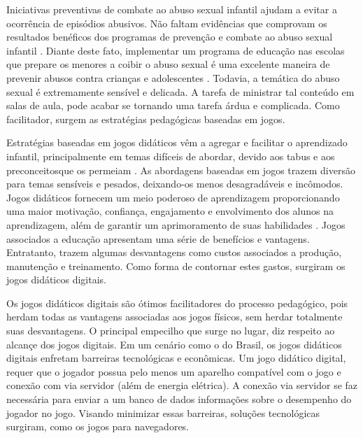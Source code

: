 Iniciativas preventivas de combate ao abuso sexual infantil ajudam a evitar a ocorrência de episódios abusivos. Não faltam evidências que comprovam os resultados benéficos dos programas de prevenção e combate ao abuso sexual infantil \cite{maria2010papel}. Diante deste fato, implementar um programa de educação nas escolas que prepare os menores a coibir o abuso sexual é uma excelente maneira de prevenir abusos contra crianças e adolescentes \cite{santos2009guia}. Todavia, a temática do abuso sexual é extremamente sensível e delicada. A tarefa de ministrar tal conteúdo em salas de aula, pode acabar se tornando uma tarefa árdua e complicada. Como facilitador, surgem as estratégias pedagógicas baseadas em jogos. 

Estratégias baseadas em jogos didáticos vêm a agregar e facilitar o aprendizado infantil, principalmente em temas difíceis de abordar, devido aos tabus e aos preconceitosque os permeiam \cite{miranda2018abordagem}. As abordagens baseadas em jogos trazem diversão para temas sensíveis e pesados, deixando-os menos desagradáveis e incômodos. Jogos didáticos fornecem um meio poderoso de aprendizagem proporcionando uma maior motivação, confiança, engajamento e envolvimento dos alunos na aprendizagem, além de garantir um aprimoramento de suas habilidades \cite{dip2016advancing}. Jogos associados a educação apresentam uma série de benefícios e vantagens. Entratanto, trazem algumas desvantagens como custos associados a produção, manutenção e treinamento. Como forma de contornar estes gastos, surgiram os jogos didáticos digitais.




Os jogos didáticos digitais são ótimos facilitadores do processo pedagógico, pois herdam todas as vantagens associadas aos jogos físicos, sem herdar totalmente suas desvantagens. O principal empecilho que surge no lugar, diz respeito ao alcançe dos jogos digitais. Em um cenário como o do Brasil, os jogos didáticos digitais enfretam barreiras tecnológicas e econômicas. Um jogo didático digital, requer que o jogador possua pelo menos um aparelho compatível com o jogo e conexão com via servidor (além de energia elétrica). A conexão via servidor se faz necessária para enviar a um banco de dados informações sobre o desempenho do jogador no jogo. Visando minimizar essas barreiras, soluções tecnológicas surgiram, como os jogos para navegadores. 

